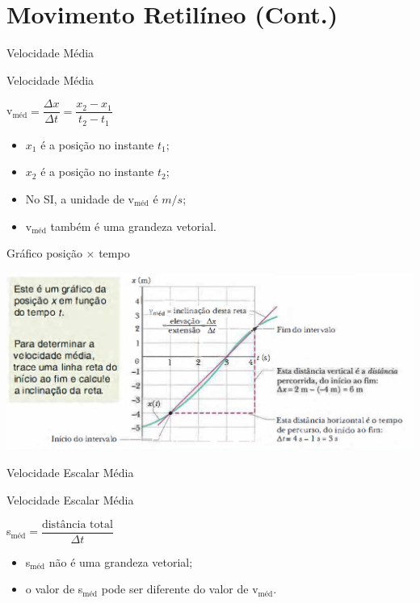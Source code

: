 \documentclass[xcolor=dvipsnames,table]{beamer}
\begin{document}
	\section{Movimento Retilíneo (Cont.)}
	\begin{frame}{Velocidade Média}
		\begin{block}{Velocidade Média}
			\begin{center}
				v$_{\mbox{méd}} = \dfrac{\Delta x}{\Delta t} = \dfrac{x_2 - x_1}{t_2 - t_1}$
			\end{center} 
			\begin{itemize}
				\item $x_1$ é a posição no instante $t_1$;
				\item $x_2$ é a posição no instante $t_2$; 
				\item No SI, a unidade de v$_{\mbox{méd}}$ é $m/s$; 
				\item v$_{\mbox{méd}}$ também é uma grandeza vetorial.
			\end{itemize}
		\end{block}
	\end{frame}


	\begin{frame}{Gráfico posição $\times$ tempo}
		\begin{center}
			\includegraphics[scale=0.35]{images/fig2-4}
		\end{center}
	\end{frame}

	\begin{frame}{Velocidade Escalar Média}
		\begin{block}{Velocidade Escalar Média}
			\begin{center}
				s$_{\mbox{méd}} = \dfrac{\mbox{distância total}}{\Delta t} $
			\end{center} 
			\begin{itemize}
				\item s$_{\mbox{méd}}$ não é uma grandeza vetorial;
				\item o valor de s$_{\mbox{méd}}$ pode ser diferente do valor de v$_{\mbox{méd}}$.
			\end{itemize}
		\end{block}
	\end{frame}
\end{document}

